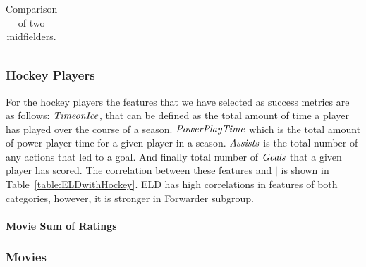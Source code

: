 {\begin{table}[htbp]
{\begin{tabular}{|l|l|c|c|c|c|c|c|c|}
				\end{tabular}}
				\caption{Comparison of two midfielders.\label{table:MidfielderComparison}}
			\end{table}

	
	
						
						\begin{table}
						
						
							\centering
									\caption{Correlation between $\mid$ metric and success metrics of NHL Players.	\label{table:ELDwithHockey}}
							\end{table}
	\subsubsection{Hockey Players}
	For the hockey players the features that we have selected as success metrics are as follows: $\it{Time on Ice}$, that can be defined as the total amount of time a player has played over the course of a season. $\it{Power Play Time}$ which is the total amount of power player time for a given player in a season. $\it{Assists}$ is the total number of any actions that led to a goal. And finally total number of $\it{Goals}$ that a given player has scored.
The correlation between these features and $\mid$ is shown in Table~\ref{table:ELDwithHockey}. ELD has high correlations in features of both categories, however, it is stronger in Forwarder subgroup.
		\paragraph{Movie Sum of Ratings}
	\subsubsection{Movies} 
	
}
